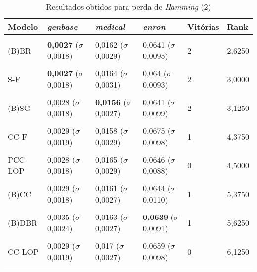 \begin{table}[htbp]
	\centering
	\caption{Resultados obtidos para perda de \textit{{Hamming}} (2)}
		\begin{tabular}
        { p{0.88in} p{0.88in} p{0.88in} p{0.88in} p{0.88in} p{0.88in} }
        
        \hline
Modelo & \textit{genbase} & \textit{medical} & \textit{enron} & \textbf{Vitórias} & \textbf{Rank} \\ 
\hline \\

(B)BR & \textbf{0,0027} \newline ($\sigma$ 0,0018) & 0,0162 \newline ($\sigma$ 0,0029) & 0,0641 \newline ($\sigma$ 0,0095) & 2 & 2,6250 \\ \\
S-F & \textbf{0,0027} \newline ($\sigma$ 0,0018) & 0,0164 \newline ($\sigma$ 0,0031) & 0,064 \newline ($\sigma$ 0,0093) & 2 & 3,0000 \\ \\
(B)SG & 0,0028 \newline ($\sigma$ 0,0018) & \textbf{0,0156} \newline ($\sigma$ 0,0027) & 0,0641 \newline ($\sigma$ 0,0099) & 2 & 3,1250 \\ \\
CC-F & 0,0029 \newline ($\sigma$ 0,0019) & 0,0158 \newline ($\sigma$ 0,0029) & 0,0675 \newline ($\sigma$ 0,0098) & 1 & 4,3750 \\ \\
PCC-LOP & 0,0028 \newline ($\sigma$ 0,0018) & 0,0165 \newline ($\sigma$ 0,0029) & 0,0646 \newline ($\sigma$ 0,0088) & 0 & 4,5000 \\ \\
(B)CC & 0,0029 \newline ($\sigma$ 0,0018) & 0,0161 \newline ($\sigma$ 0,0027) & 0,0644 \newline ($\sigma$ 0,0110) & 1 & 5,3750 \\ \\
(B)DBR & 0,0035 \newline ($\sigma$ 0,0024) & 0,0163 \newline ($\sigma$ 0,0027) & \textbf{0,0639} \newline ($\sigma$ 0,0091) & 1 & 5,6250 \\ \\
CC-LOP & 0,0029 \newline ($\sigma$ 0,0019) & 0,017 \newline ($\sigma$ 0,0027) & 0,0659 \newline ($\sigma$ 0,0098) & 0 & 6,1250 \\ \\


\end{tabular}
\end{table}
